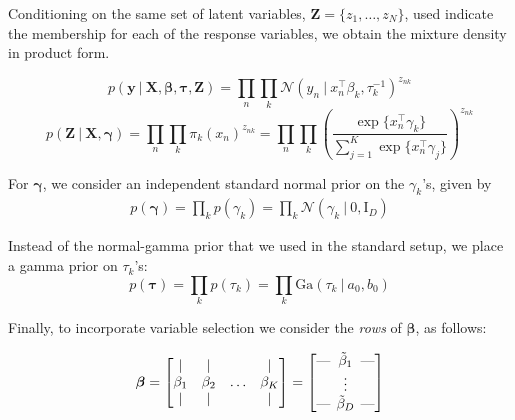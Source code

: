 \documentclass[twoside,11pt]{article}
\newcommand{\eye}{\mathrm{I}}
\newcommand\given[1][]{\:#1\vert\:}
\newcommand{\transpose}[1]{#1^{\intercal}}
\newcommand{\nprod}{\prod\limits_{n}}
\newcommand{\kprod}{\prod\limits_{k}}
\newcommand{\boldbeta}{\boldsymbol\beta}
\newcommand{\boldgamma}{\boldsymbol\gamma}
\newcommand{\boldtau}{\boldsymbol\tau}
\newcommand{\sumexp}{\sum_{j=1}^{K} \exp \{ \transpose{x_n} \gamma_j \}}
\begin{document}

Conditioning on the same set of latent variables, $\mathbf{Z} = \{ z_1, \ldots, z_N \}$, used indicate the membership for each of the response variables, we obtain the mixture density in product form. 

\begin{equation} 
	p \left( \mathbf{y} \given \mathbf{X}, \boldsymbol\beta, \boldsymbol{\tau}, \mathbf{Z} \right) = 
	\prod_{n} \prod_{k} \mathcal{N} \left( y_n \given \transpose{x_n} \beta_k, \tau_{k}^{-1} \right)^{z_{nk}}
\end{equation}
\begin{equation} 
	p \left( \mathbf{Z} \given \mathbf{X}, \boldsymbol\gamma \right) = \nprod \kprod \pi_{k} (x_n)^{z_{nk}} = 
	\nprod \kprod \left( \frac{\exp\{\transpose{x_n} \gamma_k\}}{\sumexp}\right)^{z_{nk}}
\end{equation}

For $\boldgamma$, we consider an independent standard normal prior on the $\gamma_k$'s, given by
\begin{equation}
\begin{split}
	 p(\boldgamma) = \kprod p(\gamma_k) = \kprod \mathcal{N} \left( \gamma_k \given 0, \eye_D \right)
\end{split}
\end{equation}

Instead of the normal-gamma prior that we used in the standard setup, we place a gamma prior on $\tau_k$'s: 
\begin{equation}
	p(\boldtau) = \kprod p(\tau_k) = \kprod \mathrm{Ga} \left( \tau_k \given a_0, b_0 \right)
\end{equation}



Finally, to incorporate variable selection we consider the \textit{rows} of $\boldbeta$, as follows:

\[
\boldbeta = 
\begin{bmatrix}
    \vert &    \vert   &   &\vert\\
    \beta_1  & \beta_2 &   \ldots & \beta_K\\
    \vert &     \vert  &    &\vert
\end{bmatrix}
= 
\begin{bmatrix}
    \text{---} \hspace{-0.2cm} & \tilde{\beta}_1 & \hspace{-0.2cm} \text{---} \\
    \text{   } \hspace{-0.2cm} & \vdots          & \hspace{-0.2cm} \text{   } \\
    \text{---} \hspace{-0.2cm} & \tilde{\beta}_D & \hspace{-0.2cm} \text{---}
\end{bmatrix}
\]
\end{document}
